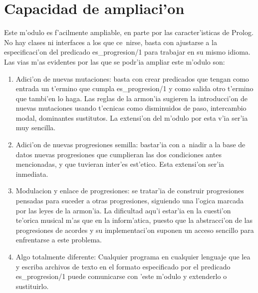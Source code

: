 \documentclass[a4paper,12pt]{article}
\begin{document}
\section {Capacidad de ampliaci'on}
Este m'odulo es f'acilmente ampliable, en parte por las caracter'isticas de Prolog. No hay clases ni interfaces a los que ce~nirse, basta con ajustarse a la especificaci'on del predicado es\_progresion/1 para trabajar en su mismo idioma. Las vias m'as evidentes por las que se podr'ia ampliar este m'odulo son:
        \begin{enumerate}
        \item Adici'on de nuevas mutaciones: basta con crear predicados que tengan como entrada un t'ermino que cumpla es\_progresion/1 y como salida otro t'ermino que tambi'en lo haga. Las reglas de la armon'ia sugieren la introducci'on de nuevas mutaciones usando t'ecnicas como disminuidos de paso, intercambio modal, dominantes sustitutos. La extensi'on del m'odulo por esta v'ia ser'ia muy sencilla.
        \item Adici'on de nuevas progresiones semilla: bastar'ia con a~niadir a la base de datos nuevas progresiones que cumplieran las dos condiciones antes mencionadas, y que tuvieran inter'es est'etico. Esta extensi'on ser'ia inmediata.
        \item Modulacion y enlace de progresiones: se tratar'ia de construir progresiones pensadas para suceder a otras progresiones, siguiendo una l'ogica marcada por las leyes de la armon'ia. La dificultad aqu'i estar'ia en la cuesti'on te'orica musical m'as que en la inform'atica, puesto que la abstracci'on de las progresiones de acordes y su implementaci'on suponen un acceso sencillo para enfrentarse a este problema.
        \item Algo totalmente diferente: Cualquier programa en cualquier lenguaje que lea y escriba archivos de texto en el formato especificado por el predicado es\_progresion/1 puede comunicarse con 'este m'odulo y extenderlo o sustituirlo.
        \end{enumerate}
\end{document}
